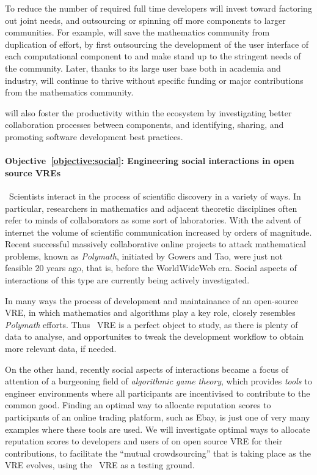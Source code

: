 \documentclass[noworkareas,deliverables,\classoptions]{euproposal}       %
\begin{document}
\begin{proposal}

To reduce the number of required full time developers \TheProject will
invest toward factoring out joint needs, and outsourcing or spinning
off more components to larger communities.
%
For example, \TheProject will save the mathematics community from
duplication of effort, by first outsourcing the development of the user
interface of each computational component to \IPython and make
\IPython stand up to the stringent needs of the community.  Later,
thanks to its large user base both in academia and industry, \IPython
will continue to thrive without specific funding or major
contributions from the mathematics community.

\TheProject will also foster the productivity within the ecosystem by
investigating better collaboration processes between components, and
identifying, sharing, and promoting software development best
practices.

\paragraph{Objective~\ref{objective:social}: Engineering social interactions in open source VREs}\
Scientists interact in the process of scientific discovery in a variety of ways.
In particular, researchers in mathematics and adjacent theoretic disciplines often refer
to minds of collaborators as some sort of laboratories. With the advent of internet
the volume of scientific communication increased by orders of magnitude. Recent
successful massively collaborative online projects to attack mathematical 
problems, known as \emph{Polymath}, initiated by Gowers and Tao, were just not 
feasible 20 years ago, that is, before the WorldWideWeb era.
Social aspects of interactions of this type are currently being actively investigated.

In many ways the process of development and maintainance of an open-source VRE, in which mathematics
and algorithms play a key role, closely resembles \emph{Polymath} efforts.
Thus \TheProject\ VRE is a perfect object to study, as there is plenty of data to analyse, and 
opportunites to tweak the development workflow to obtain more relevant data, if needed.

On the other hand, recently social aspects of interactions became a focus of attention
of a burgeoning field of \emph{algorithmic game theory}, which provides \emph{tools} to engineer 
environments where all participants are incentivised to contribute to the common good.
Finding an optimal way to allocate reputation scores to participants of
an online trading platform, such as Ebay, is just one of very many examples where
these tools are used. We will investigate optimal ways to allocate reputation scores to 
developers and users of on open source VRE for their contributions, to facilitate
the ``mutual crowdsourcing'' that is taking place as the VRE evolves, using the \TheProject\ VRE
as a testing ground.


\end{proposal}
\end{document}
